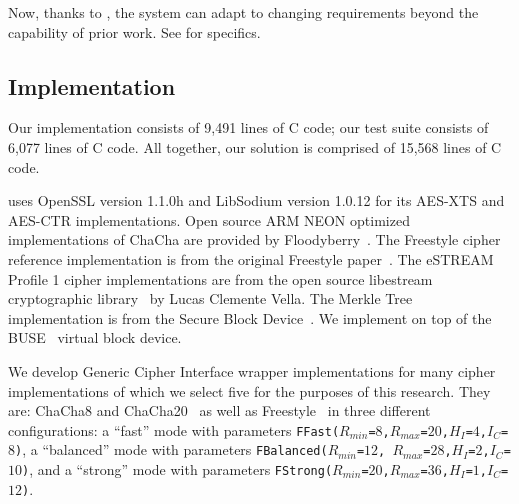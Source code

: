Now, thanks to \sys{}, the system can adapt to changing requirements beyond
the capability of prior work. See  for specifics.

\subsection{\sys{} Implementation} \label{subsec:implementation}

Our \sys{} implementation consists of 9,491 lines of C code; our test suite
consists of 6,077 lines of C code. All together, our solution is comprised of
15,568 lines of C code.

\sys{} uses OpenSSL version 1.1.0h and LibSodium version 1.0.12 for its
AES-XTS and AES-CTR implementations. Open source ARM NEON optimized
implementations of ChaCha are provided by Floodyberry~\cite{Floodyberry}. The
Freestyle cipher reference implementation is from the original Freestyle
paper~\cite{Freestyle}. The eSTREAM Profile 1 cipher implementations are from
the open source libestream cryptographic library~\cite{libestream} by Lucas
Clemente Vella. The Merkle Tree implementation is from the Secure Block
Device~\cite{SBD}. We implement \sys{} on top of the BUSE~\cite{BUSE}
virtual block device.

We develop Generic Cipher Interface wrapper implementations for many
cipher implementations of which we select five for the purposes of
this research. They are: ChaCha8 and ChaCha20~\cite{ChaCha20} as well
as Freestyle~\cite{Freestyle} in three different configurations: a
``fast'' mode with parameters
\texttt{FFast($R_{min}$=$8$,$R_{max}$=$20$,$H_I$=$4$,$I_C$=$8$)}, a
``balanced'' mode with parameters \texttt{FBalanced($R_{min}$=$12$,
  $R_{max}$=$28$,$H_I$=$2$,$I_C$=$10$)}, and a ``strong'' mode with
parameters
\texttt{FStrong($R_{min}$=$20$,$R_{max}$=$36$,$H_I$=$1$,$I_C$=$12$)}.
